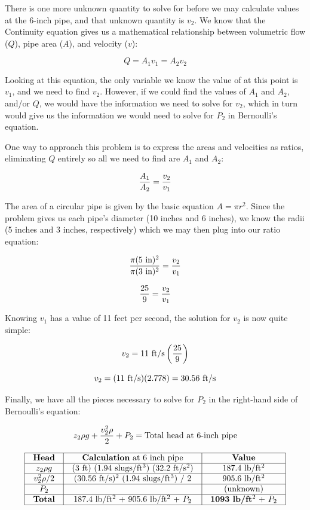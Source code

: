 \vskip 10pt

\filbreak

There is one more unknown quantity to solve for before we may calculate values at the 6-inch pipe, and that unknown quantity is $v_2$.  We know that the Continuity equation gives us a mathematical relationship between volumetric flow ($Q$), pipe area ($A$), and velocity ($v$):

$$Q = A_1 v_1 = A_2 v_2$$

Looking at this equation, the only variable we know the value of at this point is $v_1$, and we need to find $v_2$.  However, if we could find the values of $A_1$ and $A_2$, and/or $Q$, we would have the information we need to solve for $v_2$, which in turn would give us the information we would need to solve for $P_2$ in Bernoulli's equation.

One way to approach this problem is to express the areas and velocities as ratios, eliminating $Q$ entirely so all we need to find are $A_1$ and $A_2$:

$${A_1 \over A_2} = {v_2 \over v_1}$$

The area of a circular pipe is given by the basic equation $A = \pi r^2$.  Since the problem gives us each pipe's diameter (10 inches and 6 inches), we know the radii (5 inches and 3 inches, respectively) which we may then plug into our ratio equation:

$${\pi (5\hbox{ in})^2 \over \pi (3\hbox{ in})^2} = {v_2 \over v_1}$$

$${25 \over 9} = {v_2 \over v_1}$$

Knowing $v_1$ has a value of 11 feet per second, the solution for $v_2$ is now quite simple:

$$v_2 = 11 \hbox{ ft/s} \left({25 \over 9}\right)$$

$$v_2 = (11 \hbox{ ft/s}) (2.778) = 30.56 \hbox{ ft/s}$$

\vskip 10pt

\filbreak

Finally, we have all the pieces necessary to solve for $P_2$ in the right-hand side of Bernoulli's equation:

$$z_2 \rho g + {v_2^2 \rho \over 2} + P_2 = \hbox{Total head at 6-inch pipe}$$


$$\vbox{\offinterlineskip
\halign{\strut
\vrule \quad\hfil # \ \hfil & 
\vrule \quad\hfil # \ \hfil & 
\vrule \quad\hfil # \ \hfil \vrule \cr
\noalign{\hrule}
%
\textbf{Head} & \textbf{Calculation} at 6 inch pipe & \textbf{Value} \cr
%
\noalign{\hrule}
%
$z_2 \rho g$ & (3 ft) (1.94 slugs/ft$^{3}$) (32.2 ft/s$^{2}$) & 187.4 lb/ft$^{2}$ \cr
%
\noalign{\hrule}
%
$v_2^2 \rho / 2$ & (30.56 ft/s)$^{2}$ (1.94 slugs/ft$^{3}$) / 2 & 905.6 lb/ft$^{2}$ \cr
%
\noalign{\hrule}
%
$P_2$ &  & (unknown) \cr
%
\noalign{\hrule}
%
\textbf{Total} & 187.4 lb/ft$^{2}$ + 905.6 lb/ft$^{2}$ + $P_2$ & \textbf{1093 lb/ft$^{2}$} + $P_2$ \cr
%
\noalign{\hrule}
} %
}$$ %

